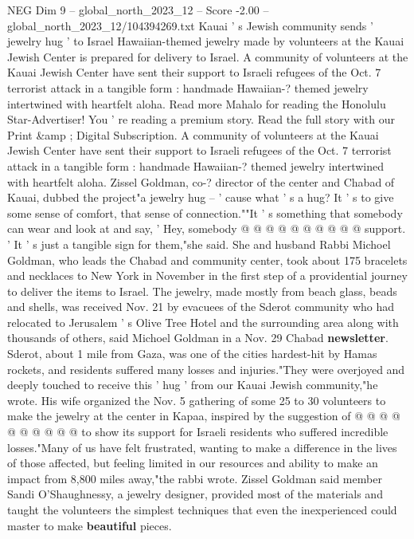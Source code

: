 \begin{textsample}{NEG Dim 9 – global\_north\_2023\_12 – Score -2.00 – global\_north\_2023\_12/104394269.txt}  \label{ex:f9_neg_288}
Kauai ' s Jewish community sends ' jewelry hug ' to Israel Hawaiian-themed jewelry made by volunteers at the Kauai Jewish Center is prepared for delivery to Israel.
A community of volunteers at the Kauai Jewish Center have sent their support to Israeli refugees of the Oct. 7 terrorist attack in a tangible form : handmade Hawaiian-? themed jewelry intertwined with heartfelt aloha.
Read more Mahalo for reading the Honolulu Star-Advertiser!
You ' re reading a premium story.
Read the full story with our Print \&amp ; Digital Subscription.
A community of volunteers at the Kauai Jewish Center have sent their support to Israeli refugees of the Oct. 7 terrorist attack in a tangible form : handmade Hawaiian-? themed jewelry intertwined with heartfelt aloha.
Zissel Goldman, co-? director of the center and Chabad of Kauai, dubbed the project"a jewelry hug -- ' cause what ' s a hug?
It ' s to give some sense of comfort, that sense of connection.""It ' s something that somebody can wear and look at and say, ' Hey, somebody @ @ @ @ @ @ @ @ @ @ support. ' It ' s just a tangible sign for them,"she said.
She and husband Rabbi Michoel Goldman, who leads the Chabad and community center, took about 175 bracelets and necklaces to New York in November in the first step of a providential journey to deliver the items to Israel.
The jewelry, made mostly from beach glass, beads and shells, was received Nov. 21 by evacuees of the Sderot community who had relocated to Jerusalem ' s Olive Tree Hotel and the surrounding area along with thousands of others, said Michoel Goldman in a Nov. 29 Chabad \textbf{newsletter}.
Sderot, about 1 mile from Gaza, was one of the cities hardest-hit by Hamas rockets, and residents suffered many losses and injuries."They were overjoyed and deeply touched to receive this ' hug ' from our Kauai Jewish community,"he wrote.
His wife organized the Nov. 5 gathering of some 25 to 30 volunteers to make the jewelry at the center in Kapaa, inspired by the suggestion of @ @ @ @ @ @ @ @ @ @ to show its support for Israeli residents who suffered incredible losses."Many of us have felt frustrated, wanting to make a difference in the lives of those affected, but feeling limited in our resources and ability to make an impact from 8,800 miles away,"the rabbi wrote.
Zissel Goldman said member Sandi O'Shaughnessy, a jewelry designer, provided most of the materials and taught the volunteers the simplest techniques that even the inexperienced could master to make \textbf{beautiful} pieces.

\end{textsample}
